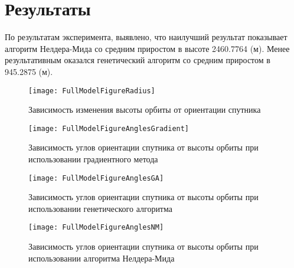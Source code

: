 \section{Результаты}
\noindent\indent По результатам эксперимента, выявлено, что наилучший результат
показывает алгоритм Нелдера-Мида со средним приростом в высоте 2460.7764 (м). Менее
результативным оказался генетический алгоритм со средним приростом в 945.2875 (м).
\begin{figure}[h]
  \centering
  \texttt{[image: FullModelFigureRadius]}
  \caption{Зависимость изменения высоты орбиты от ориентации спутника}
  \label{fig:KeplerParams2Angles}
\end{figure}\par
\begin{figure}[h]
  \centering
  \texttt{[image: FullModelFigureAnglesGradient]}
  \caption{Зависимость углов ориентации спутника от высоты орбиты при использовании
  градиентного метода}
  \label{fig:KeplerParams2Angles}
\end{figure}\par
\begin{figure}[h]
  \centering
  \texttt{[image: FullModelFigureAnglesGA]}
  \caption{Зависимость углов ориентации спутника от высоты орбиты при использовании
  генетического алгоритма}
  \label{fig:KeplerParams2Angles}
\end{figure}\par
\begin{figure}[!h]
  \centering
  \texttt{[image: FullModelFigureAnglesNM]}
  \caption{Зависимость углов ориентации спутника от высоты орбиты при использовании
  алгоритма Нелдера-Мида}
  \label{fig:KeplerParams2Angles}
\end{figure}
\clearpage
